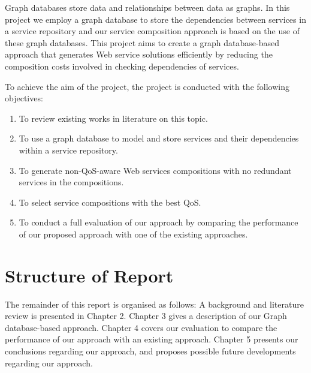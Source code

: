 Graph databases store data and relationships \cite{6} between data as graphs. In this project we employ a graph database to store the dependencies between services in a service repository and our service composition approach is based on the use of these graph databases. This project aims to create a graph database-based approach that generates Web service solutions efficiently by reducing the composition costs involved in checking dependencies of services. 

To achieve the aim of the project, the project is conducted with the following objectives:
\begin{enumerate}
  \item To review existing works in literature on this topic.
  \item To use a graph database to model and store services and their dependencies within a service repository.
  \item To generate non-QoS-aware Web services compositions with no redundant services in the compositions.
  \item To select service compositions with the best QoS. 
  \item To conduct a full evaluation of our approach by comparing the performance of our proposed approach with one of the existing approaches.
\end{enumerate}



\section{Structure of Report} 
The remainder of this report is organised as follows: A background and literature review is presented in Chapter 2. Chapter 3 gives a description of our Graph database-based approach. Chapter 4 covers our evaluation to compare the performance of our approach with an existing approach.  Chapter 5 presents our conclusions regarding our approach, and proposes possible future developments regarding our approach.


